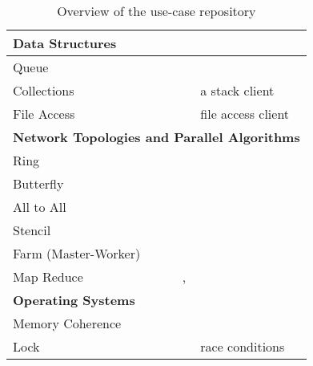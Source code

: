\begin{table}
\begin{tabular}{|l|l|l|l|}
	\hline
	\hline
	\multicolumn{4}{|l|}{ \textbf{Data Structures}}
	\\
	\hline
	Queue & \cite{Queue} & \Sill &
	\\ 
	Collections & \cite{Stack} & \TypeState  & a stack client
	\\
	File Access & \cite{FileAccess} & \TypeState & file access client
	\\

	\hline
	\hline
	\multicolumn{4}{|l|}{ \textbf{Network Topologies and Parallel Algorithms}}
	\\
	\hline
	Ring & \cite{BerkleyPar} & \MPI &
	\\
	Butterfly & \cite{BerkleyPar} & \MPI &
	\\
	All to All & \cite{BerkleyPar} & \MPI &
	\\
	Stencil & \cite{BerkleyPar} & \MPI &
	\\ 
	Farm (Master-Worker) & \cite{BerkleyPar} & \MPI &
	\\
	Map Reduce & \cite{BerkleyPar} & \MPI, \SPython &
	\\ 
	\hline

	\hline
	\hline
	\multicolumn{4}{|l|}{\textbf{Operating Systems}}
	\\ 
	\hline %
	Memory Coherence & \cite{memoryCoherence} & \TypeState &
	\\
	Lock & \cite{Lock} & \ESJ & race conditions
	\\
	\hline
\end{tabular}
\caption{Overview of the use-case repository}
\label{table:use_cases_all}
\end{table}

